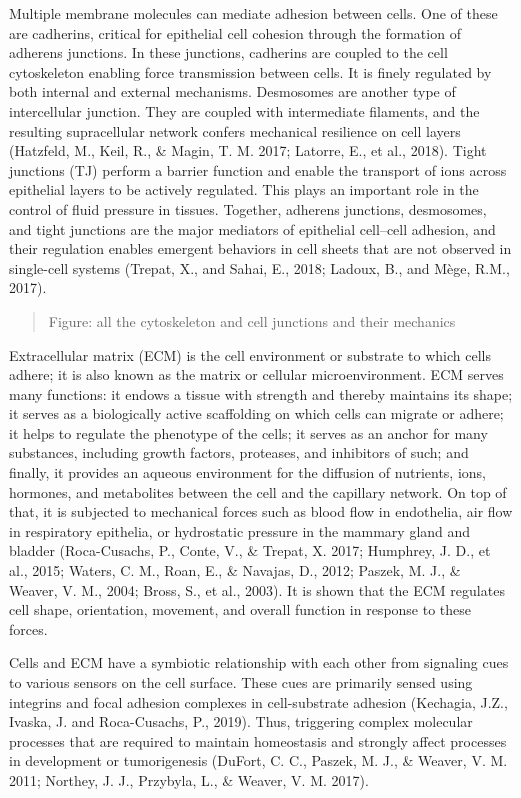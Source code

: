Multiple membrane molecules can mediate adhesion between cells. One of
these are cadherins, critical for epithelial cell cohesion through the
formation of adherens junctions. In these junctions, cadherins are
coupled to the cell cytoskeleton enabling force transmission between
cells. It is finely regulated by both internal and external mechanisms.
Desmosomes are another type of intercellular junction. They are coupled
with intermediate filaments, and the resulting supracellular network
confers mechanical resilience on cell layers (Hatzfeld, M., Keil, R., \&
Magin, T. M. 2017; Latorre, E., et al., 2018). Tight junctions (TJ)
perform a barrier function and enable the transport of ions across
epithelial layers to be actively regulated. This plays an important role
in the control of fluid pressure in tissues. Together, adherens
junctions, desmosomes, and tight junctions are the major mediators of
epithelial cell--cell adhesion, and their regulation enables emergent
behaviors in cell sheets that are not observed in single-cell systems
(Trepat, X., and Sahai, E., 2018; Ladoux, B., and Mège, R.M., 2017).

\begin{quote}
	Figure: all the cytoskeleton and cell junctions and their mechanics
\end{quote}

Extracellular matrix (ECM) is the cell environment or substrate to which
cells adhere; it is also known as the matrix or cellular
microenvironment. ECM serves many functions: it endows a tissue with
strength and thereby maintains its shape; it serves as a biologically
active scaffolding on which cells can migrate or adhere; it helps to
regulate the phenotype of the cells; it serves as an anchor for many
substances, including growth factors, proteases, and inhibitors of such;
and finally, it provides an aqueous environment for the diffusion of
nutrients, ions, hormones, and metabolites between the cell and the
capillary network. On top of that, it is subjected to mechanical forces
such as blood flow in endothelia, air flow in respiratory epithelia, or
hydrostatic pressure in the mammary gland and bladder (Roca-Cusachs, P.,
Conte, V., \& Trepat, X. 2017; Humphrey, J. D., et al., 2015; Waters, C.
M., Roan, E., \& Navajas, D., 2012; Paszek, M. J., \& Weaver, V. M.,
2004; Bross, S., et al., 2003). It is shown that the ECM regulates cell
shape, orientation, movement, and overall function in response to these
forces.

Cells and ECM have a symbiotic relationship with each other from
signaling cues to various sensors on the cell surface. These cues are
primarily sensed using integrins and focal adhesion complexes in
cell-substrate adhesion (Kechagia, J.Z., Ivaska, J. and Roca-Cusachs,
P., 2019). Thus, triggering complex molecular processes that are
required to maintain homeostasis and strongly affect processes in
development or tumorigenesis (DuFort, C. C., Paszek, M. J., \& Weaver,
V. M. 2011; Northey, J. J., Przybyla, L., \& Weaver, V. M. 2017).

